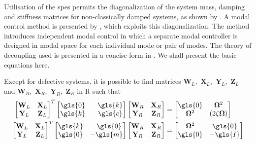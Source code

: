 Utilisation of the \glspl{spe} permits the diagonalization of the system mass, 
damping and stiffness matrices for non-classically damped systems, as shown by 
\citet{GARVEY2002885,GARVEY2002911}. A modal control method is presented by 
\citet{Houlston2007}, which exploits this diagonalization. The method 
introduces independent modal control in which a separate modal controller is 
designed in modal space for each individual mode or pair of modes. The theory 
of decoupling used is presented in a concise form in \citet{Friswell2001}. We 
shall present the basic equations here. 

Except for defective systems, it is possible to find matrices
$\mathbf{W}_L,$ $\mathbf{X}_{L},$ $\mathbf{Y}_{L},$ $\mathbf{Z}_L$ and $\mathbf{W}_R,$ 
$\mathbf{X}_R, $ $\mathbf{Y}_R, $ $\mathbf{Z}_R$ in \gls{R}
such that
\begin{align}
	\begin{bmatrix}
		\mathbf{W}_L & \mathbf{X}_{L}\\
		\mathbf{Y}_{L} & \mathbf{Z}_L
	\end{bmatrix}^T
	\begin{bmatrix}
		\gls{0} & \phantom{-}\gls{k}\\
		\gls{k} & \phantom{-}\gls{c}
	\end{bmatrix}
	\begin{bmatrix}
		\mathbf{W}_R & \mathbf{X}_R\\
		\mathbf{Y}_R & \mathbf{Z}_R
	\end{bmatrix} &= 
	\begin{bmatrix}
		\gls{0} & \mathbf{\Omega}^2\\
		\mathbf{\Omega}^2 & (2\mathbf{\zeta\Omega})
	\end{bmatrix}\\	
	\begin{bmatrix}
		\mathbf{W}_L & \mathbf{X}_L\\
		\mathbf{Y}_L & \mathbf{Z}_L
	\end{bmatrix}^T
	\begin{bmatrix}
		\gls{k} & \phantom{-}\gls{0}\\
		\gls{0} & -\gls{m}
	\end{bmatrix}
	\begin{bmatrix}
		\mathbf{W}_R & \mathbf{X}_R\\
		\mathbf{Y}_R & \mathbf{Z}_R
	\end{bmatrix} &= 
	\begin{bmatrix}
		\mathbf{\Omega}^2 & \gls{0} \\
		\gls{0}  & -\gls{I} 

\end{bmatrix}
\end{align}

